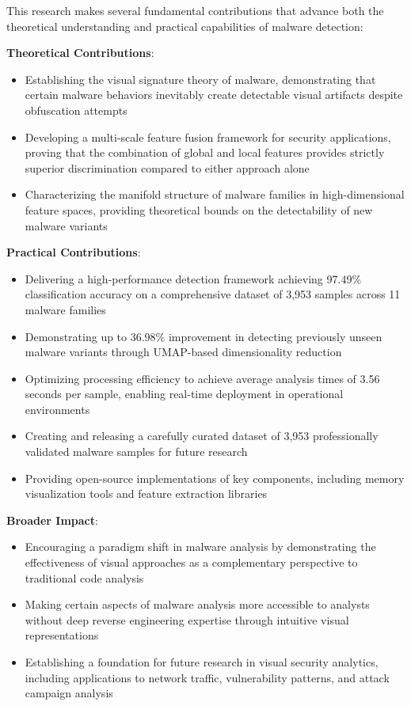 This research makes several fundamental contributions that advance both the theoretical understanding and practical capabilities of malware detection:

\textbf{Theoretical Contributions}:
\begin{itemize}
    \item Establishing the visual signature theory of malware, demonstrating that certain malware behaviors inevitably create detectable visual artifacts despite obfuscation attempts
    
    \item Developing a multi-scale feature fusion framework for security applications, proving that the combination of global and local features provides strictly superior discrimination compared to either approach alone
    
    \item Characterizing the manifold structure of malware families in high-dimensional feature spaces, providing theoretical bounds on the detectability of new malware variants
\end{itemize}

\textbf{Practical Contributions}:
\begin{itemize}
    \item Delivering a high-performance detection framework achieving 97.49\% classification accuracy on a comprehensive dataset of 3,953 samples across 11 malware families
    
    \item Demonstrating up to 36.98\% improvement in detecting previously unseen malware variants through UMAP-based dimensionality reduction
    
    \item Optimizing processing efficiency to achieve average analysis times of 3.56 seconds per sample, enabling real-time deployment in operational environments
    
    \item Creating and releasing a carefully curated dataset of 3,953 professionally validated malware samples for future research
    
    \item Providing open-source implementations of key components, including memory visualization tools and feature extraction libraries
\end{itemize}

\textbf{Broader Impact}:
\begin{itemize}
    \item Encouraging a paradigm shift in malware analysis by demonstrating the effectiveness of visual approaches as a complementary perspective to traditional code analysis
    
    \item Making certain aspects of malware analysis more accessible to analysts without deep reverse engineering expertise through intuitive visual representations
    
    \item Establishing a foundation for future research in visual security analytics, including applications to network traffic, vulnerability patterns, and attack campaign analysis
\end{itemize}

